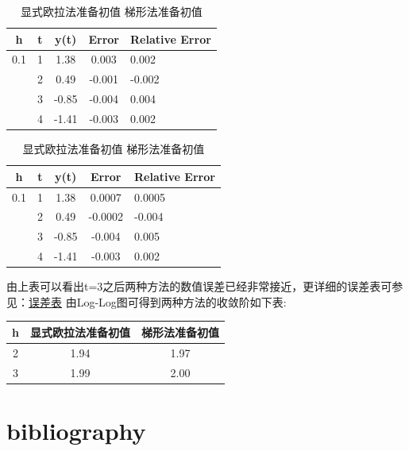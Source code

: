 \documentclass[10pt]{ctexart}
\newcommand{\head}[1]{\textbf{#1}}
\begin{document}
\begin{table}[!ht]
\caption{显式欧拉法准备初值 \qquad\qquad\quad 梯形法准备初值}
\begin{tabular}{ccccp{1.5cm}}
\hline
\head{h} & \head{t} & \head{y(t)} & \head{Error} & \head{Relative Error} \\
\hline
0.1 & 1 & 1.38 & 0.003 & 0.002 \\
    & 2 & 0.49 & -0.001 & -0.002 \\
    & 3 & -0.85 & -0.004 & 0.004 \\
    & 4 & -1.41 & -0.003 & 0.002 \\
\hline
\end{tabular}
\begin{tabular}{ccccp{1.5cm}}
\hline
\head{h} & \head{t} & \head{y(t)} & \head{Error} & \head{Relative Error} \\
\hline
0.1 & 1 & 1.38 & 0.0007 & 0.0005 \\
    & 2 & 0.49 & -0.0002 & -0.004 \\
    & 3 & -0.85 & -0.004 & 0.005 \\
    & 4 & -1.41 & -0.003 & 0.002 \\
\hline
\end{tabular}
\end{table}

由上表可以看出t=3之后两种方法的数值误差已经非常接近，更详细的误差表可参见：\href{multiframe.html}{误差表}
由Log-Log图可得到两种方法的收敛阶如下表:\\

\begin{tabular}{ccc}
\hline
\head{h} & \head{显式欧拉法准备初值} & \head{梯形法准备初值}\\
\hline
2  & 1.94 & 1.97\\
3  & 1.99 & 2.00\\
\hline
\end{tabular}

\section{bibliography}
\end{document}
